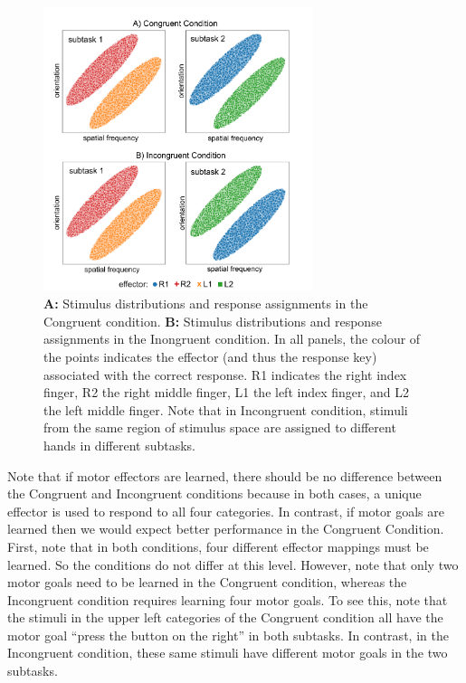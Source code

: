 \documentclass[doc, floatsintext]{apa7}
\begin{document}
\begin{figure}[h!]
    \centering
    \includegraphics[width=0.7\textwidth]{../figures/fig_categories_stim_space.png}
    \caption{
        \textbf{A:} Stimulus distributions  and response assignments in the Congruent condition.
        \textbf{B:} Stimulus distributions  and response assignments in the Inongruent condition.
        In all panels, the colour of the points indicates the effector (and thus the response key) associated with the correct response.  R1 indicates the right index finger, R2 the right middle finger, L1 the left index finger, and L2 the left middle finger. Note that in Incongruent condition, stimuli from the same region of stimulus space are assigned to different
hands in different subtasks.}
    \label{fig:Cats}
\end{figure}

Note that if motor effectors are learned, there should be no difference between the Congruent and Incongruent conditions because in both cases, a unique effector is used to respond to all four categories. In contrast, if motor goals are learned then we would expect better performance in the Congruent Condition. First, note that in both conditions, four different effector mappings must be learned. So the conditions do not differ at this level.  However, note that only two motor goals need to be learned in the Congruent condition, whereas the Incongruent condition requires learning four motor goals. To see this, note that the stimuli in the upper left categories of the Congruent condition all have the motor goal ``press the button on the right'' in both subtasks. In contrast, in the Incongruent condition, these same stimuli have different motor goals in the two subtasks. 
\end{document}
